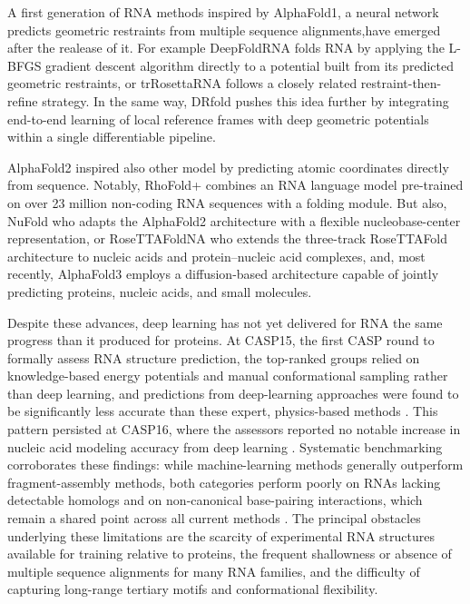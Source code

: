 \documentclass[11pt,a4paper]{article}
\begin{document}
A first generation of RNA methods inspired by AlphaFold1, a neural network predicts geometric restraints from multiple sequence alignments,have emerged after the realease of it. For example DeepFoldRNA \cite{pearce2022deepfoldrna} folds RNA by applying the L-BFGS gradient descent algorithm directly to a potential built from its predicted geometric restraints, or trRosettaRNA \cite{wang2023trrosettarna} follows a closely related restraint-then-refine strategy. In the same way, DRfold \cite{li2023drfold} pushes this idea further by integrating end-to-end learning of local reference frames with deep geometric potentials within a single differentiable pipeline. 

AlphaFold2 inspired also other model by predicting atomic coordinates directly from sequence. Notably, RhoFold+ \cite{shen2024rhofold} combines an RNA language model pre-trained on over 23 million non-coding RNA sequences with a folding module. But also, NuFold \cite{kagaya2025nufold} who adapts the AlphaFold2 architecture with a flexible nucleobase-center representation, or RoseTTAFoldNA \cite{baek2024rosettafoldna} who extends the three-track RoseTTAFold architecture to nucleic acids and protein–nucleic acid complexes, and, most recently, AlphaFold3 \cite{abramson2024alphafold3} employs a diffusion-based architecture capable of jointly predicting proteins, nucleic acids, and small molecules.

Despite these advances, deep learning has not yet delivered for RNA the same progress than it produced for proteins. At CASP15, the first CASP round to formally assess RNA structure prediction, the top-ranked groups relied on knowledge-based energy potentials and manual conformational sampling rather than deep learning, and predictions from deep-learning approaches were found to be significantly less accurate than these expert, physics-based methods \cite{das2023casp15}. This pattern persisted at CASP16, where the assessors reported no notable increase in nucleic acid modeling accuracy from deep learning \cite{kretsch2025casp16}. Systematic benchmarking corroborates these findings: while machine-learning methods generally outperform fragment-assembly methods, both categories perform poorly on RNAs lacking detectable homologs and on non-canonical base-pairing interactions, which remain a shared point across all current methods \cite{bahai2024benchmarking}. The principal obstacles underlying these limitations are the scarcity of experimental RNA structures available for training relative to proteins, the frequent shallowness or absence of multiple sequence alignments for many RNA families, and the difficulty of capturing long-range tertiary motifs and conformational flexibility.
\end{document}
